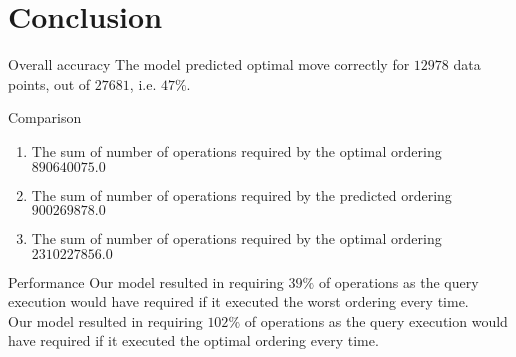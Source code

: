 \section{Conclusion}
\frame{\sectionpage}

\begin{frame}{Overall accuracy}
    The model predicted optimal move correctly for $12978$ data points, out of $27681$, i.e. $47\%$.\\
\end{frame}

\begin{frame}{Comparison}
    \begin{enumerate}
        \item The sum of number of operations required by the optimal ordering $890640075.0$
        \item The sum of number of operations required by the predicted ordering $900269878.0$
        \item The sum of number of operations required by the optimal ordering $2310227856.0$
    \end{enumerate}
\end{frame}

\begin{frame}{Performance}
    Our model resulted in requiring $39\%$ of operations as the query execution would have required if it executed the worst ordering every time.\\
    Our model resulted in requiring $102\%$ of operations as the query execution would have required if it executed the optimal ordering every time.\\
\end{frame}



